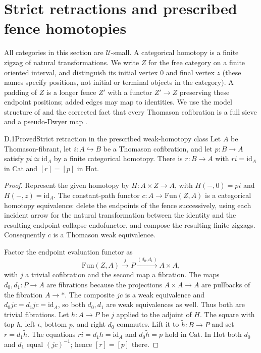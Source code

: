 \section{Strict retractions and prescribed fence homotopies}
\label{sec:D}

All categories in this section are $\mathcal U$-small. A categorical homotopy is a finite zigzag of natural transformations. We write $Z$ for the free category on a finite oriented interval, and distinguish its initial vertex $0$ and final vertex $z$ (these names specify positions, not initial or terminal objects in the category). A padding of $Z$ is a longer fence $Z'$ with a functor $Z'\to Z$ preserving these endpoint positions; added edges may map to identities. We use the model structure of \citet[Theorem~4.9]{D_Thomason1980} and the corrected fact that every Thomason cofibration is a full sieve and a pseudo-Dwyer map \citep[Proposition~2]{D_Cisinski1999}.

\begin{claim}{D.1}{Proved}{Strict retraction in the prescribed weak-homotopy class}
Let $A$ be Thomason-fibrant, let $i:A\hookrightarrow B$ be a Thomason cofibration, and let $p:B\to A$ satisfy $pi\simeq\mathrm{id}_A$ by a finite categorical homotopy. There is $r:B\to A$ with $ri=\mathrm{id}_A$ in $\mathrm{Cat}$ and $[r]=[p]$ in $\mathrm{Hot}$.
\end{claim}
\begin{proof}
Represent the given homotopy by $H:A\times Z\to A$, with $H(-,0)=pi$ and $H(-,z)=\mathrm{id}_A$. The constant-path functor $c:A\to\mathrm{Fun}(Z,A)$ is a categorical homotopy equivalence: delete the endpoints of the fence successively, using each incident arrow for the natural transformation between the identity and the resulting endpoint-collapse endofunctor, and compose the resulting finite zigzags. Consequently $c$ is a Thomason weak equivalence.

Factor the endpoint evaluation functor as
\[
 \mathrm{Fun}(Z,A)\xrightarrow{j}P
 \xrightarrow{(d_0,d_1)}A\times A,
\]
with $j$ a trivial cofibration and the second map a fibration. The maps $d_0,d_1:P\to A$ are fibrations because the projections $A\times A\to A$ are pullbacks of the fibration $A\to *$. The composite $jc$ is a weak equivalence and $d_0jc=d_1jc=\mathrm{id}_A$, so both $d_0,d_1$ are weak equivalences as well. Thus both are trivial fibrations. Let $h:A\to P$ be $j$ applied to the adjoint of $H$. The square with top $h$, left $i$, bottom $p$, and right $d_0$ commutes. Lift it to $\widetilde h:B\to P$ and set $r=d_1\widetilde h$. The equations $ri=d_1h=\mathrm{id}_A$ and $d_0\widetilde h=p$ hold in $\mathrm{Cat}$. In $\mathrm{Hot}$ both $d_0$ and $d_1$ equal $(jc)^{-1}$; hence $[r]=[p]$ there.
\end{proof}

